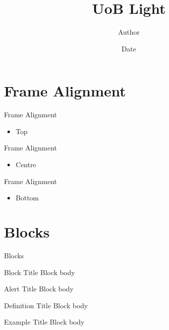 \documentclass[
aspectratio=169
]{beamer}
\title{UoB Light}
\date{Date}
\author{Author}
\begin{document}
	
	\begin{frame}
		\titlepage
	\end{frame}
	
	\section{Frame Alignment}
	
	\begin{frame}[t]{Frame Alignment}
		\begin{itemize}
			\item Top
		\end{itemize}
	\end{frame}
	\begin{frame}[c]{Frame Alignment}
		\begin{itemize}
			\item Centre
		\end{itemize}
	\end{frame}
	\begin{frame}[b]{Frame Alignment}
		\begin{itemize}
			\item Bottom
		\end{itemize}
	\end{frame}
	
	\section{Blocks}
	
	\begin{frame}{Blocks}
		\begin{block}{Block Title}
			Block body
		\end{block}
		\begin{alertblock}{Alert Title}
			Block body
		\end{alertblock}
		\begin{definition}{Definition Title}
			Block body
		\end{definition}
		\begin{example}{Example Title}
			Block body
		\end{example}
	\end{frame}
	
	
\end{document}
